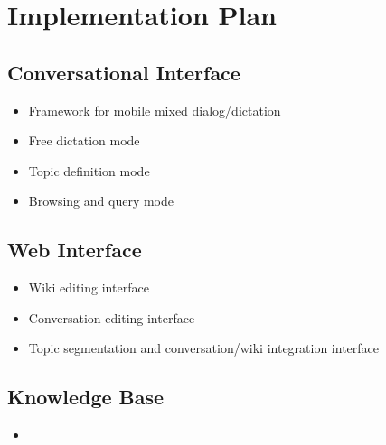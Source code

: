 \documentclass{article}
\begin{document}
\section{Implementation Plan}
\label{sec:plan}

\subsection{Conversational Interface}
\label{sec:conv}

\begin{itemize}
\item Framework for mobile mixed dialog/dictation
\item Free dictation mode
\item Topic definition mode
\item Browsing and query mode
\end{itemize}

\subsection{Web Interface}
\label{sec:webint}

\begin{itemize}
\item Wiki editing interface
\item Conversation editing interface
\item Topic segmentation and conversation/wiki integration interface
\end{itemize}

\subsection{Knowledge Base}
\label{sec:kb}

\begin{itemize}
\item 
\end{itemize}
\end{document}

